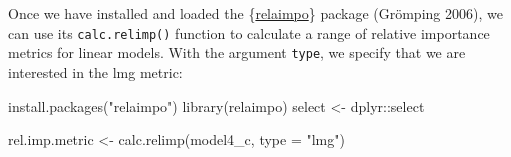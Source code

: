 \documentclass[
  letterpaper,
  DIV=11,
  numbers=noendperiod]{scrreprt}
\newenvironment{Shaded}{\begin{snugshade}}{\end{snugshade}}
\newcommand{\AttributeTok}[1]{\textcolor[rgb]{0.40,0.45,0.13}{#1}}
\newcommand{\FunctionTok}[1]{\textcolor[rgb]{0.28,0.35,0.67}{#1}}
\newcommand{\NormalTok}[1]{\textcolor[rgb]{0.00,0.23,0.31}{#1}}
\newcommand{\OtherTok}[1]{\textcolor[rgb]{0.00,0.23,0.31}{#1}}
\newcommand{\SpecialCharTok}[1]{\textcolor[rgb]{0.37,0.37,0.37}{#1}}
\newcommand{\StringTok}[1]{\textcolor[rgb]{0.13,0.47,0.30}{#1}}
\begin{document}
Once we have installed and loaded the
\{\href{https://cran.r-universe.dev/relaimpo/doc/manual.html}{relaimpo}\}
package (Grömping 2006), we can use its \texttt{calc.relimp()} function
to calculate a range of relative importance metrics for linear models.
With the argument \texttt{type}, we specify that we are interested in
the lmg metric:

\begin{Shaded}
\begin{Highlighting}[]
\FunctionTok{install.packages}\NormalTok{(}\StringTok{"relaimpo"}\NormalTok{)}
\FunctionTok{library}\NormalTok{(relaimpo)}
\NormalTok{select }\OtherTok{\textless{}{-}}\NormalTok{ dplyr}\SpecialCharTok{::}\NormalTok{select}

\NormalTok{rel.imp.metric }\OtherTok{\textless{}{-}} \FunctionTok{calc.relimp}\NormalTok{(model4\_c, }
                              \AttributeTok{type =} \StringTok{"lmg"}\NormalTok{)}
\end{Highlighting}
\end{Shaded}
\end{document}
